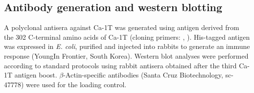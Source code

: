 \subsection*{Antibody generation and western blotting}

A polyclonal antisera against Ca-\alpha1T was generated using antigen derived from the 302 C-terminal amino acids of Ca-\alpha1T (cloning primers: , ).
His-tagged antigen was expressed in \emph{E. coli}, purified and injected into rabbits to generate an immune response (YoungIn Frontier, South Korea).
Western blot analyses were performed according to standard protocols using rabbit antisera obtained after the third Ca-\alpha1T antigen boost.
$\beta$-Actin-specific antibodies (Santa Cruz Biotechnology, sc-47778) were used for the loading control.
